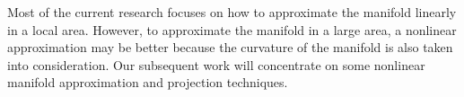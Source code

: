 \documentclass[aos,preprint]{imsart}
\theoremstyle{remark}
\begin{document}
Most of the current research focuses on how to approximate the manifold linearly in a local area. However, to approximate the manifold in a large area, a nonlinear approximation may be better because the curvature of the manifold is also taken into consideration. Our subsequent work will concentrate on some nonlinear manifold approximation and projection techniques.

%
\end{document}
